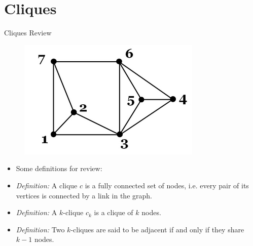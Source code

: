 \documentclass[aspectratio=169, handout]{beamer}
\begin{document}
\section{Cliques}
\frame{\sectionpage}
\begin{frame}{Cliques Review}
\begin{figure}
\centering
\includegraphics[scale=0.3]{images/clique-1.png}
\end{figure}
\begin{itemize}
\item Some definitions for review:
\pause
\item \textit{Definition:} A clique $c$ is a fully connected set of nodes, i.e.
every pair of its vertices is connected by a link in the graph.
\item \textit{Definition:} A $k$-clique $c_k$ is a clique of $k$ nodes.
\item \textit{Definition:} Two $k$-cliques are said to be adjacent if
and only if they share $k-1$ nodes.
\end{itemize}
\end{frame}
\end{document}
